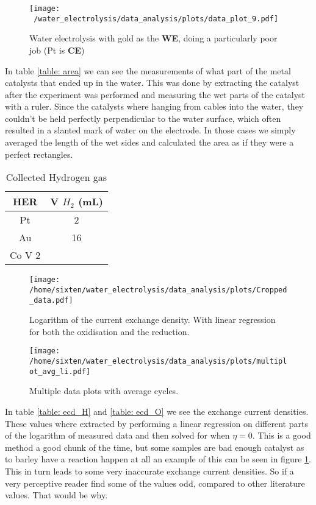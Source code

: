 \documentclass[twocolumn, floatfix]{revtex4-2}
\begin{document}
\begin{figure}[h]
	\texttt{[image: ~/water\_electrolysis/data\_analysis/plots/data\_plot\_9.pdf]}
	
	\caption{Water electrolysis with gold as the \textbf{WE}, doing a particularly poor job (Pt 
	is \textbf{CE})\label{figure: Au_Pt_current}}
\end{figure}

In table \ref{table: area} we can see the measurements of what part of the metal catalysts
that ended up in the water. This was done by extracting the catalyst after the experiment
was performed and measuring the wet parts of the catalyst with a ruler. Since the catalysts 
where hanging from cables into the water, they couldn't be held perfectly perpendicular to 
the water surface, which often resulted in a slanted mark of water on the electrode.
In those cases we simply averaged the length of the wet sides and calculated the area as 
if they were a perfect rectangles. 

\begin{table}[h]
	\begin{tabular}{c | c}
		HER & V $H_2$ (mL) \\
		\hline
		\hline
		Pt & 2 \\
		Au & 16 \\
		Co V 2 \\
	\end{tabular}
	\caption{Collected Hydrogen gas\label{table: gases}}
	
\end{table}
\par 

\begin{figure*}[t]
	\centering
	\begin{minipage}{0.45\linewidth}
	\texttt{[image: /home/sixten/water\_electrolysis/data\_analysis/plots/Cropped\_data.pdf]}
	\caption{Logarithm of the current exchange density. With linear regression for both 
	the oxidisation and the reduction.\label{figure: CD_plat}}
	\end{minipage}
	\begin{minipage}{0.45\linewidth}
	\texttt{[image: /home/sixten/water\_electrolysis/data\_analysis/plots/multiplot\_avg\_li.pdf]}
	\caption{Multiple data plots with average cycles. \label{figure: Average cycle}}
	\end{minipage}
\end{figure*}
In table \ref{table: ecd_H} and \ref{table: ecd_O} we see the exchange current densities.
These values where extracted by performing a linear regression on 
different parts of the logarithm of measured data and then solved for when $\eta = 0$. This is a good method a good chunk of the 
time, but some samples are bad enough catalyst as to barley 
have a reaction happen at all an example of this can be seen in figure \ref{figure: Au_Pt_current}.
This in turn leads to some very inaccurate exchange current densities. So if 
a very perceptive reader find some of the values odd, compared to other literature values. That would
be why.
\end{document}
